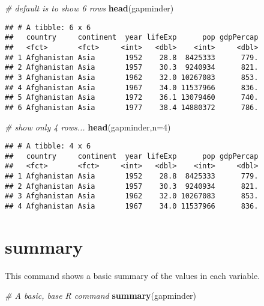 \documentclass[
]{book}
\newenvironment{Shaded}{\begin{snugshade}}{\end{snugshade}}
\newcommand{\CommentTok}[1]{\textcolor[rgb]{0.56,0.35,0.01}{\textit{#1}}}
\newcommand{\DataTypeTok}[1]{\textcolor[rgb]{0.13,0.29,0.53}{#1}}
\newcommand{\DecValTok}[1]{\textcolor[rgb]{0.00,0.00,0.81}{#1}}
\newcommand{\KeywordTok}[1]{\textcolor[rgb]{0.13,0.29,0.53}{\textbf{#1}}}
\newcommand{\NormalTok}[1]{#1}
\begin{document}
\begin{Shaded}
\begin{Highlighting}[]
\CommentTok{# default is to show 6 rows}
\KeywordTok{head}\NormalTok{(gapminder)}
\end{Highlighting}
\end{Shaded}

\begin{verbatim}
## # A tibble: 6 x 6
##   country     continent  year lifeExp      pop gdpPercap
##   <fct>       <fct>     <int>   <dbl>    <int>     <dbl>
## 1 Afghanistan Asia       1952    28.8  8425333      779.
## 2 Afghanistan Asia       1957    30.3  9240934      821.
## 3 Afghanistan Asia       1962    32.0 10267083      853.
## 4 Afghanistan Asia       1967    34.0 11537966      836.
## 5 Afghanistan Asia       1972    36.1 13079460      740.
## 6 Afghanistan Asia       1977    38.4 14880372      786.
\end{verbatim}

\begin{Shaded}
\begin{Highlighting}[]
\CommentTok{# show only 4 rows...}
\KeywordTok{head}\NormalTok{(gapminder,}\DataTypeTok{n=}\DecValTok{4}\NormalTok{)}
\end{Highlighting}
\end{Shaded}

\begin{verbatim}
## # A tibble: 4 x 6
##   country     continent  year lifeExp      pop gdpPercap
##   <fct>       <fct>     <int>   <dbl>    <int>     <dbl>
## 1 Afghanistan Asia       1952    28.8  8425333      779.
## 2 Afghanistan Asia       1957    30.3  9240934      821.
## 3 Afghanistan Asia       1962    32.0 10267083      853.
## 4 Afghanistan Asia       1967    34.0 11537966      836.
\end{verbatim}

\hypertarget{summary}{%
\section{summary}\label{summary}}

This command shows a basic summary of the values in each variable.

\begin{Shaded}
\begin{Highlighting}[]
\CommentTok{# A basic, base R command}
\KeywordTok{summary}\NormalTok{(gapminder)}
\end{Highlighting}
\end{Shaded}
\end{document}
